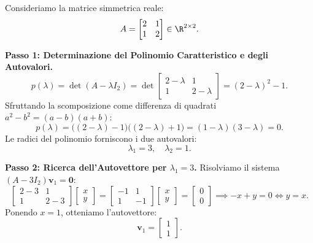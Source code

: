 \begin{example}
\label{ex:autovalori-2x2}
Consideriamo la matrice simmetrica reale:
\begin{equation}
    A = \begin{bmatrix} 2 & 1 \\ 1 & 2 \end{bmatrix} \in \R^{2 \times 2}.
\end{equation}

\noindent\textbf{Passo 1: Determinazione del Polinomio Caratteristico e degli Autovalori.}
\begin{equation}
    p(\lambda) = \det(A - \lambda I_2) = \det \begin{bmatrix} 2-\lambda & 1 \\ 1 & 2-\lambda \end{bmatrix} = (2-\lambda)^2 - 1.
\end{equation}
Sfruttando la scomposizione come differenza di quadrati $a^2 - b^2 = (a-b)(a+b)$:
\begin{equation}
    p(\lambda) = \big((2-\lambda) - 1\big)\big((2-\lambda) + 1\big) = (1-\lambda)(3-\lambda) = 0.
\end{equation}
Le radici del polinomio forniscono i due autovalori:
\begin{equation}
    \lambda_1 = 3, \quad \lambda_2 = 1.
\end{equation}

\noindent\textbf{Passo 2: Ricerca dell'Autovettore per $\lambda_1 = 3$.}
Risolviamo il sistema $(A - 3I_2)\mathbf{v}_1 = \mathbf{0}$:
\begin{equation}
    \begin{bmatrix} 2-3 & 1 \\ 1 & 2-3 \end{bmatrix} \begin{bmatrix} x \\ y \end{bmatrix} = \begin{bmatrix} -1 & 1 \\ 1 & -1 \end{bmatrix} \begin{bmatrix} x \\ y \end{bmatrix} = \begin{bmatrix} 0 \\ 0 \end{bmatrix} \implies -x + y = 0 \iff y = x.
\end{equation}
Ponendo $x = 1$, otteniamo l'autovettore:
\begin{equation}
    \mathbf{v}_1 = \begin{bmatrix} 1 \\ 1 \end{bmatrix}.
\end{equation}


\end{example}
